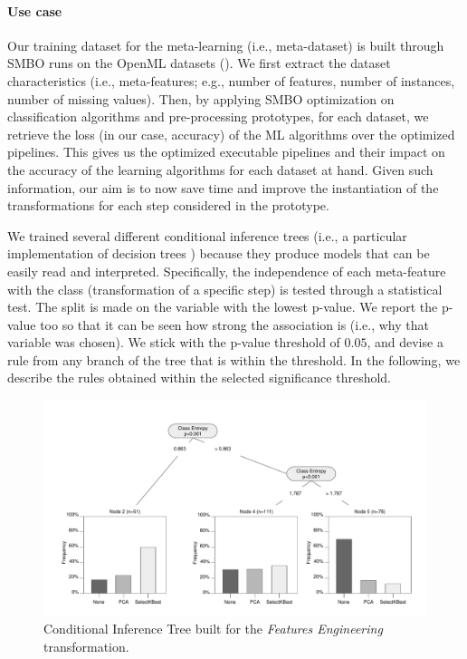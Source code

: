 \paragraph{Use case}
Our training dataset for the meta-learning (i.e., meta-dataset) is built through SMBO runs on the OpenML datasets ().
We first extract the dataset characteristics (i.e., meta-features; e.g., number of features, number of instances, number of missing values).
Then, by applying SMBO optimization on classification algorithms and pre-processing prototypes, for each dataset, we retrieve the loss (in our case, accuracy) of the ML algorithms over the optimized pipelines.
This gives us the optimized executable pipelines and their impact on the accuracy of the learning algorithms for each dataset at hand.
Given such information, our aim is to now save time and improve the instantiation of the transformations for each step considered in the prototype.

We trained several different conditional inference trees (i.e., a particular implementation of decision trees \cite{ctree}) because they produce models that can be easily read and interpreted.
Specifically, the independence of each meta-feature with the class (transformation of a specific step) is tested through a statistical test.
The split is made on the variable with the lowest p-value.
We report the p-value too so that it can be seen how strong the association is (i.e., why that variable was chosen).
We stick with the p-value threshold of $0.05$, and devise a rule from any branch of the tree that is within the threshold.
In the following, we describe the rules obtained within the selected significance threshold.


\begin{figure}[!h]
	\centering
	\includegraphics[clip, trim=1.0cm 0.4cm 1cm 1cm,width=1\textwidth]{chapters/data-centric/supervised/img/tree-FE.pdf}
	\caption{Conditional Inference Tree built for the \textit{Features Engineering} transformation.}
	\label{effective-fig:features-meta-learning:feature-engineering}
\end{figure}


